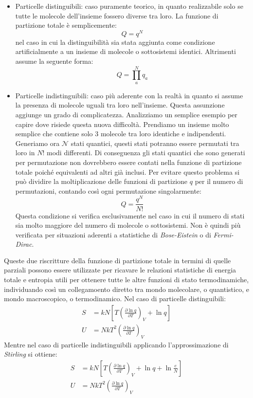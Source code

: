 \documentclass[oneside]{amsbook}
\numberwithin{section}{chapter}
\numberwithin{equation}{section}
\numberwithin{figure}{section}
\begin{document}
\begin{itemize}
\item Particelle distinguibili: caso puramente teorico, in quanto realizzabile solo se tutte le molecole dell'insieme fossero diverse tra loro. La funzione di partizione totale è semplicemente:
\begin{equation}
Q=q^N
\end{equation}
nel caso in cui la distinguibilità sia stata aggiunta come condizione artificialmente a un insieme di molecole o sottosistemi identici. Altrimenti assume la seguente forma:
\begin{equation}
Q=\prod_a^N q_a
\end{equation}
\item Particelle indistinguibili: caso più aderente con la realtà in quanto si assume la presenza di molecole uguali tra loro nell'insieme. Questa assunzione aggiunge un grado di complicatezza. Analizziamo un semplice esempio per capire dove risiede questa nuova difficoltà.
Prendiamo un insieme molto semplice che contiene solo 3 molecole tra loro identiche e indipendenti. Generiamo ora $\mathcal{N}$ stati quantici, questi stati potranno essere permutati tra loro in $N!$ modi differenti. Di conseguenza gli stati quantici che sono generati per permutazione non dovrebbero essere contati nella funzione di partizione totale poiché equivalenti ad altri già inclusi. Per evitare questo problema si può dividire la moltiplicazione delle funzioni di partizione $q$ per il numero di permutazioni, contando così ogni permutazione singolarmente:
\begin{equation}
Q=\frac{q^N}{N!}
\end{equation}
Questa condizione si verifica esclusivamente nel caso in cui il numero di stati sia molto maggiore del numero di molecole o sottosistemi. Non è quindi più verificata per situazioni aderenti a statistiche di \emph{Bose-Eistein} o di 	\emph{Fermi-Dirac}.
\end{itemize}
Queste due riscritture della funzione di partizione totale in termini di quelle parziali possono essere utilizzate per ricavare le relazioni statistiche di energia totale e entropia utili per ottenere tutte le altre funzioni di stato termodinamiche, individuando così un collegamoento diretto tra mondo molecolare, o quantistico, e mondo macroscopico, o termodinamico.
Nel caso di particelle distinguibili:
\begin{equation}
\begin{aligned}
S&=kN\left[T\left(\frac{\partial\ln q}{\partial T}\right)_{V}+\ln q\right]\\
U&=NkT^2\left(\frac{\partial\ln q}{\partial T}\right)_{V}
\end{aligned}
\end{equation}
Mentre nel caso di particelle indistinguibili applicando l'approssimazione di \emph{Stirling }si ottiene:
\begin{equation}
\label{pioo}
\begin{aligned}
S&=kN\left[T\left(\frac{\partial\ln q}{\partial T}\right)_{V}+\ln q+\ln\frac{e}{N}\right]\\
U&=NkT^2\left(\frac{\partial\ln q}{\partial T}\right)_{V}
\end{aligned}
\end{equation}
\end{document}
